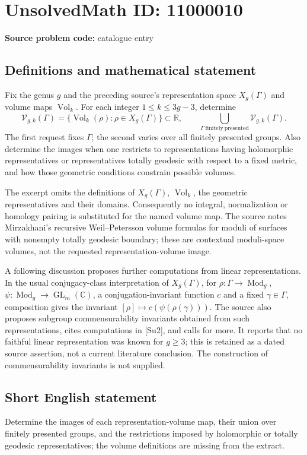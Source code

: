 \documentclass[11pt]{article}
\newcommand{\R}{\mathbb{R}}
\newcommand{\C}{\mathbb{C}}
\begin{document}
\section*{UnsolvedMath ID: 11000010}
\textbf{Source problem code:} catalogue entry
\subsection{Definitions and mathematical statement}
Fix the genus \(g\) and the preceding source's representation space \(X_g(\Gamma)\) and volume maps \(\operatorname{Vol}_k\). For each integer \(1\leq k\leq3g-3\), determine
\[
 \mathcal V_{g,k}(\Gamma)
   =\{\operatorname{Vol}_k(\rho):\rho\in X_g(\Gamma)\}\subset\R,
 \qquad
 \bigcup_{\Gamma\ \mathrm{finitely\ presented}}
         \mathcal V_{g,k}(\Gamma).
\]
The first request fixes \(\Gamma\); the second varies over all finitely presented groups. Also determine the images when one restricts to representations having holomorphic representatives or representatives totally geodesic with respect to a fixed metric, and how those geometric conditions constrain possible volumes.

The excerpt omits the definitions of \(X_g(\Gamma)\), \(\operatorname{Vol}_k\), the geometric representatives and their domains. Consequently no integral, normalization or homology pairing is substituted for the named volume map. The source notes Mirzakhani's recursive Weil--Petersson volume formulas for moduli of surfaces with nonempty totally geodesic boundary; these are contextual moduli-space volumes, not the requested representation-volume image.

A following discussion proposes further computations from linear representations. In the usual conjugacy-class interpretation of \(X_g(\Gamma)\), for \(\rho:\Gamma\to\operatorname{Mod}_g\), \(\psi:\operatorname{Mod}_g\to\operatorname{GL}_m(\C)\), a conjugation-invariant function \(c\) and a fixed \(\gamma\in\Gamma\), composition gives the invariant
\( [\rho]\mapsto c(\psi(\rho(\gamma)))\).
The source also proposes subgroup commensurability invariants obtained from such representations, cites computations in [Su2], and calls for more. It reports that no faithful linear representation was known for \(g\geq3\); this is retained as a dated source assertion, not a current literature conclusion. The construction of commensurability invariants is not supplied.
\subsection{Short English statement}
Determine the images of each representation-volume map, their union over finitely presented groups, and the restrictions imposed by holomorphic or totally geodesic representatives; the volume definitions are missing from the extract.
\end{document}
